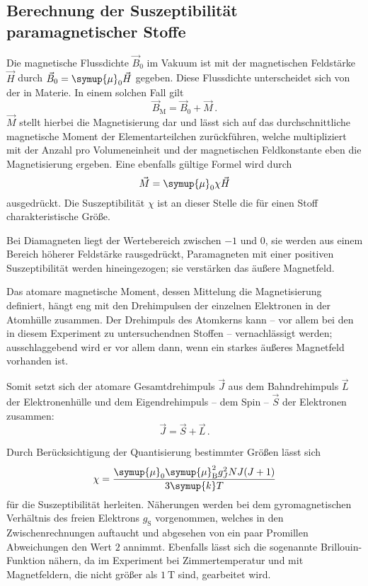 \subsection{Berechnung der Suszeptibilität paramagnetischer Stoffe}

    Die magnetische Flussdichte $\vec{B}_0$ im Vakuum ist mit der magnetischen Feldstärke $\vec{H}$ durch ${\vec{B}_0=\symup{\mu}_0 \vec{H}}$
    gegeben. Diese Flussdichte unterscheidet sich von der in Materie. 
    In einem solchen Fall gilt 
    \begin{equation}
        \vec{B}_\text{M}= \vec{B}_0 + \vec{M} \,.
        \label{eqn:Flussdichte}
    \end{equation}
    $\vec{M}$ stellt hierbei die Magnetisierung dar und lässt sich auf das durchschnittliche magnetische Moment der Elementarteilchen 
    zurückführen, welche multipliziert mit der Anzahl pro Volumeneinheit und der magnetischen Feldkonstante eben die Magnetisierung ergeben.
    Eine ebenfalls gültige Formel wird durch 
    \begin{equation*}
        \vec{M}=\symup{\mu}_0 \chi \vec{H}
    \end{equation*}
    ausgedrückt.
    Die Suszeptibilität $\chi$ ist an dieser Stelle die für einen Stoff charakteristische Größe. 

    Bei Diamagneten liegt der Wertebereich zwischen $-1$ und $0$, sie werden aus einem Bereich höherer Feldstärke rausgedrückt, 
    Paramagneten mit einer positiven Suszeptibilität werden hineingezogen; sie verstärken das äußere Magnetfeld.

    Das atomare magnetische Moment, dessen Mittelung die Magnetisierung definiert, hängt eng mit den Drehimpulsen der einzelnen 
    Elektronen in der Atomhülle zusammen. 
    Der Drehimpuls des Atomkerns kann -- vor allem bei den in diesem Experiment zu untersuchendnen Stoffen -- vernachlässigt 
    werden; ausschlaggebend wird er vor allem dann, wenn ein starkes äußeres Magnetfeld vorhanden ist.

    Somit setzt sich der atomare Gesamtdrehimpuls $\vec{J}$ aus dem Bahndrehimpuls $\vec{L}$ der Elektronenhülle und dem Eigendrehimpuls -- dem 
    Spin -- $\vec{S}$ der Elektronen zusammen:
    \begin{equation*}
        \vec{J}=\vec{S}+\vec{L} \,.
    \end{equation*}
    
    Durch Berücksichtigung der Quantisierung bestimmter Größen lässt sich 
    \begin{equation}   
        \chi = \frac{\symup{\mu}_0 \symup{\mu} _\text{B}^2 g_J^2 NJ(J+1)}{3\symup{k}T}
        \label{eqn:chii}
    \end{equation}
    für die Suszeptibilität herleiten\cite{Versuchsanleitung}. 
    Näherungen werden bei dem gyromagnetischen Verhältnis des freien Elektrons $g_\text{S}$ vorgenommen, welches in den Zwischenrechnungen auftaucht und 
    abgesehen von ein paar Promillen Abweichungen den Wert $2$ annimmt. 
    Ebenfalls lässt sich die sogenannte Brillouin-Funktion nähern, da im Experiment bei Zimmertemperatur und mit 
    Magnetfeldern, die nicht größer als $\SI{1}{\tesla}$ sind, gearbeitet wird.

